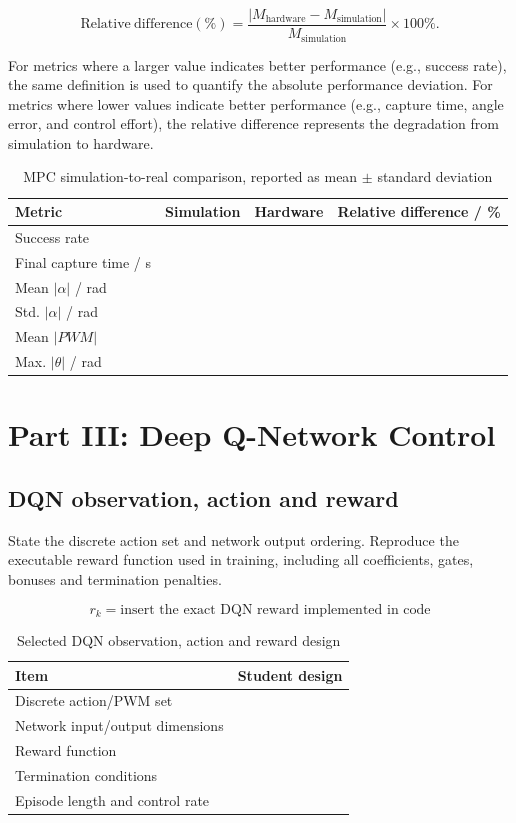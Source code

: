 \documentclass[11pt,a4paper]{article}
\begin{document}
\[
\mathrm{Relative\ difference}(\%) =
\frac{|M_{\mathrm{hardware}}-M_{\mathrm{simulation}}|}
{M_{\mathrm{simulation}}}\times100\%.
\]

For metrics where a larger value indicates better performance
(e.g., success rate), the same definition is used to quantify the
absolute performance deviation. For metrics where lower values indicate
better performance (e.g., capture time, angle error, and control effort),
the relative difference represents the degradation from simulation to
hardware.

\begin{table}[H]
\centering
\caption{MPC simulation-to-real comparison, reported as mean $\pm$ standard deviation}
\label{tab:mpcsimreal}
\begin{tabularx}{\linewidth}{Y C C C}
\toprule
Metric & Simulation & Hardware & Relative difference / \%\\
\midrule
Success rate & & & \\
Final capture time / s & & & \\
Mean $|\alpha|$ / rad & & & \\
Std. $|\alpha|$ / rad & & & \\
Mean $|PWM|$ & & & \\
Max. $|\theta|$ / rad & & & \\
\bottomrule
\end{tabularx}
\end{table}

\section{Part III: Deep Q-Network Control}
\label{sec:dqn}

\subsection{DQN observation, action and reward}

State the  discrete action set and network output
ordering. Reproduce the executable reward function used in training, including
all coefficients, gates, bonuses and termination penalties.

\begin{equation}
r_k=\boxed{\text{insert the exact DQN reward implemented in code}}
\end{equation}

\begin{table}[H]
\centering
\caption{Selected DQN observation, action and reward design}
\label{tab:dqndesign}
\begin{tabularx}{\linewidth}{p{38mm}Y}
\toprule
Item & Student design\\
\midrule
Discrete action/PWM set & \\
Network input/output dimensions & \\
Reward function & \\
Termination conditions & \\
Episode length and control rate & \\
\bottomrule
\end{tabularx}
\end{table}
\end{document}
